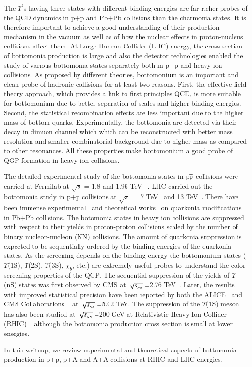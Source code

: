 The $\Upsilon^{'}$s having three states with different binding
energies are far richer probes of the QCD dynamics in p+p and Pb+Pb collisions than
the charmonia states.
It is therefore important to achieve a good understanding of their
production mechanism in the vacuum as well as of how the nuclear effects in proton-nucleus
collisions affect them.
  At Large Hadron Collider (LHC) energy, the cross section of bottomonia production
is large and also the detector technologies enabled the study of various bottomonia 
states separately both in p+p and heavy ion collisions.
As proposed by different theories, bottomonium is an important and clean probe 
of hadronic collisions for at least two reasons. 
First, the effective field theory approach, which provides a link to first 
principles QCD, is more suitable for bottomonium due to better separation of 
scales and higher binding energies. Second, the statistical recombination effects 
are less important due to the higher mass of bottom quarks.  
Experimentally, the bottomonia are detected via their decay in dimuon channel which
which can be reconstructed with better mass resolution and smaller
combinatorial background due to higher mass as compared to other resonances. 
 All these properties make bottomonium a good probe of 
QGP formation in heavy ion collisions.

The detailed experimental study of the bottomonia states in p$\overline{\rm p}$ collisions 
were carried at Fermilab at $\surd s$ = 1.8 and 1.96 TeV ~\cite{CDF:1995gwi,CDF:2001fdy,D0:2005klj}.
LHC carried out the bottomonia study in p+p collisions at
$\surd s=$ 7 TeV~\cite{CMS:2010wld,CMS:2015xqv,ATLAS:2012lmu} and
13 TeV~\cite{CMS:2017dju,LHCb:2018yzj}.
There have been immense
experimental~\cite{Sirunyan:2017isk,Sirunyan:2017lzi,CMS:2018zza,Acharya:2019iur,ALICE:2018wzm}
and theoretical works~\cite{Strickland:2011mw,Song:2011nu,Kumar:2014kfa,Kumar:2019xdj} on
quarkonia modifications in Pb+Pb collisions.
The botomonia states in heavy ion collisions are suppressed with respect to their yields
in proton-proton collisions scaled by the number of binary nucleon-nucleon
(NN) collisions.
The amount of quarkonia suppression is expected to be sequentially ordered by the binding
energies of the quarkonia states.
 As the screening depends on the  binding energy the bottomonium states ($\Upsilon$(1S), $\Upsilon$(2S),
$\Upsilon$(3S), $\chi_{b}$, etc.) are extremely useful probes to understand the color screening
properties of the QGP.
The sequential suppression of the yields of $\Upsilon$(nS) states was first observed by
CMS at $\sqrt{s_{_{NN}}} =$2.76 TeV~\cite{Chatrchyan:2011pe,Chatrchyan:2012lxa}. Later, the results with
improved statistical precision have been reported by both the ALICE~\cite{ALICE:2018wzm}
and CMS Collaborations ~\cite{Sirunyan:2017lzi,CMS:2018zza} at $\sqrt{s_{_{NN}}} =$5.02 TeV.
The suppression of the $\Upsilon$(1S)
meson has also been studied at $\sqrt{s_{_{NN}}} =$200 GeV at Relativistic Heavy Ion Collider
(RHIC)~\cite{STAR:2013kwk}, although the 
bottomonia production cross section is small at lower energies. 

In this writeup, we review experimental and theoretical aspects of bottomonia production in p+p, p+A
and A+A collisions at RHIC and LHC energies.







